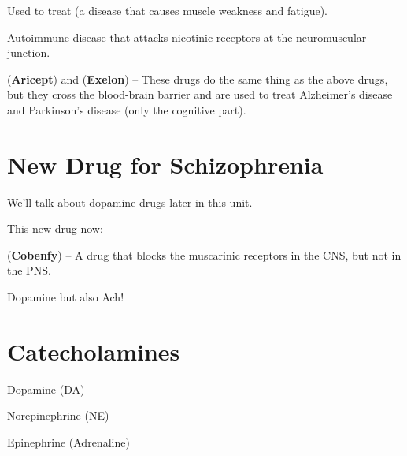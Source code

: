 \begin{coloredlist}
\begin{coloredlist}
\begin{coloredlist}
\begin{coloredlist}
                \item Used to treat  (a disease that causes muscle weakness and fatigue).
                \begin{coloredlist}
                    \item Autoimmune disease that attacks nicotinic receptors at the neuromuscular junction.
                \end{coloredlist}
            \end{coloredlist}
            \item {} (\textbf{Aricept}) and  (\textbf{Exelon}) -- These drugs do the same thing as the above drugs, but they cross the blood-brain barrier and are used to treat Alzheimer's disease and Parkinson's disease (only the cognitive part).
        \end{coloredlist}
    \end{coloredlist}
\end{coloredlist}

\section{New Drug for Schizophrenia}

\begin{coloredlist}
    \item We'll talk about dopamine drugs later in this unit.
    \item This new drug now:
    \begin{coloredlist}
        \item {} (\textbf{Cobenfy}) -- A drug that blocks the muscarinic receptors in the CNS, but not in the PNS.
        \item Dopamine but also Ach!
    \end{coloredlist}
\end{coloredlist}

\section{Catecholamines}

\begin{coloredlist}
    \item Dopamine (DA)
    \item Norepinephrine (NE)
    \item Epinephrine (Adrenaline)
\end{coloredlist}

